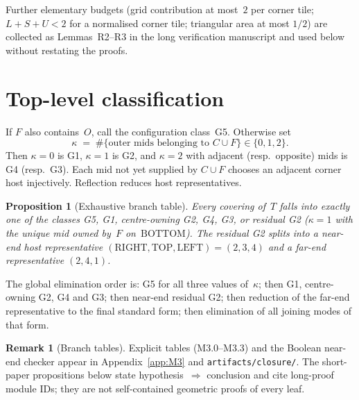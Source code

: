 \documentclass[11pt,reqno]{amsart}
\newtheorem{proposition}[theorem]{Proposition}
\theoremstyle{definition}
\newtheorem{remark}[theorem]{Remark}
\newcommand{\BOTTOM}{\mathrm{BOTTOM}}
\newcommand{\RIGHT}{\mathrm{RIGHT}}
\newcommand{\TOP}{\mathrm{TOP}}
\newcommand{\LEFT}{\mathrm{LEFT}}
\begin{document}


Further elementary budgets (grid contribution at most~$2$ per corner tile;
$L+S+U<2$ for a normalised corner tile; triangular area at most $1/2$) are
collected as Lemmas~R2--R3 in the long verification manuscript and used below
without restating the proofs.

\section{Top-level classification}\label{sec:class}

If $F$ also contains~$O$, call the configuration class~G5.  Otherwise set
\begin{equation}\label{eq:M5}
\kappa \;=\; \#\{\text{outer mids belonging to }C\cup F\}\in\{0,1,2\}.
\end{equation}
Then $\kappa=0$ is G1, $\kappa=1$ is G2, and $\kappa=2$ with adjacent (resp.\ opposite) mids
is G4 (resp.\ G3).  Each mid not yet supplied by $C\cup F$ chooses an adjacent
corner host injectively.  Reflection reduces host representatives.

\begin{proposition}[Exhaustive branch table]\label{prop:M3}
Every covering of~$T$ falls into exactly one of the classes
G5, G1, centre-owning G2, G4, G3, or residual G2
($\kappa=1$ with the unique mid owned by~$F$ on~$\BOTTOM$).
The residual G2 splits into a near-end host representative
$(\RIGHT,\TOP,\LEFT)=(2,3,4)$ and a far-end representative $(2,4,1)$.
\end{proposition}



The global elimination order is: G5 for all three values of~$\kappa$; then G1,
centre-owning G2, G4 and G3; then near-end residual G2; then reduction of the
far-end representative to the final standard form; then elimination of all
joining modes of that form.

\begin{remark}[Branch tables]
Explicit tables (M3.0--M3.3) and the Boolean near-end checker appear in
Appendix~\ref{app:M3} and \texttt{artifacts/closure/}.  The short-paper
propositions below state hypothesis~$\Rightarrow$ conclusion and cite
long-proof module IDs; they are not self-contained geometric proofs of every
leaf.
\end{remark}
\end{document}
